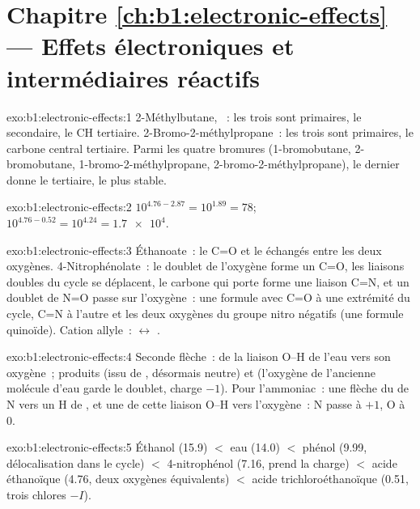 \section*{Chapitre \ref{ch:b1:electronic-effects} --- Effets électroniques et intermédiaires réactifs}

\begin{solution}{exo:b1:electronic-effects:1}
2-Méthylbutane, ~: les trois  sont
primaires, le  secondaire, le CH tertiaire.
2-Bromo-2-méthylpropane~: les trois  sont primaires, le carbone
central tertiaire. Parmi les quatre bromures  (1-bromobutane,
2-bromobutane, 1-bromo-2-méthylpropane, 2-bromo-2-méthylpropane), le
dernier donne le  tertiaire, le plus stable.
\end{solution}

\begin{solution}{exo:b1:electronic-effects:2}
$10^{4.76 - 2.87} = 10^{1.89} = 78$; $10^{4.76 - 0.52} = 10^{4.24} =
\num{1.7e4}$.
\end{solution}

\begin{solution}{exo:b1:electronic-effects:3}
Éthanoate~: le C=O et le  échangés entre les deux oxygènes.
4-Nitrophénolate~: le doublet de l'oxygène forme un C=O, les liaisons
doubles du cycle se déplacent, le carbone qui porte  forme une
liaison C=N, et un doublet de N=O passe sur l'oxygène~: une formule avec
C=O à une extrémité du cycle, C=N à l'autre et les deux oxygènes du
groupe nitro négatifs (une formule quinoïde). Cation allyle~:
 $\leftrightarrow$ .
\end{solution}

\begin{solution}{exo:b1:electronic-effects:4}
Seconde flèche~: de la liaison O--H de l'eau vers son oxygène~; produits
 (issu de , désormais neutre) et  (l'oxygène de
l'ancienne molécule d'eau garde le doublet, charge $-1$). Pour
l'ammoniac~: une flèche du  de N vers un H de
, et une de cette liaison O--H vers l'oxygène~: N passe à
$+1$, O à 0.
\end{solution}

\begin{solution}{exo:b1:electronic-effects:5}
Éthanol (15.9) $<$ eau (14.0) $<$ phénol (9.99, délocalisation dans le
cycle) $<$
4-nitrophénol (7.16,  prend la charge) $<$ acide éthanoïque
(4.76, deux oxygènes équivalents) $<$ acide trichloroéthanoïque (0.51,
trois chlores $-I$).
\end{solution}

